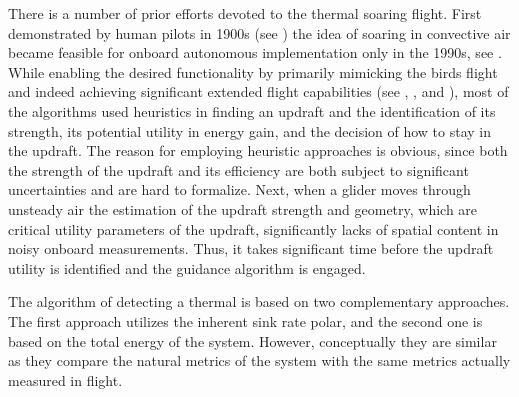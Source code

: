 \documentclass{ifacconf}
\begin{document}
There is a number of prior efforts devoted to the thermal soaring flight.
First demonstrated by human pilots in 1900s (see \cite{Simons:1998}) the idea
of soaring in convective air became feasible for onboard autonomous
implementation only in the 1990s, see \cite{Wharington:1998}. While enabling
the desired functionality by primarily mimicking the birds flight and indeed
achieving significant extended flight capabilities (see \cite{Edwards:2008},
\cite{Allen:2006}, and \cite{Allen:2007}), most of the algorithms used
heuristics in finding an updraft and the identification of its strength, its
potential utility in energy gain, and the decision of how to stay in the
updraft. The reason for employing heuristic approaches is obvious, since both
the strength of the updraft and its efficiency are both subject to
significant uncertainties and are hard to formalize.
Next, when a glider moves through unsteady air the estimation of the updraft
strength and geometry, which are critical utility parameters of the updraft,
significantly lacks of spatial content in noisy onboard measurements. Thus,
it takes significant time before the updraft utility is identified and the
guidance algorithm is engaged.
%
%

The algorithm of detecting a thermal is based on two complementary
approaches. The first approach utilizes the inherent sink rate polar, and the
second one is based on the total energy of the system. However, conceptually
they are similar as they compare the natural metrics of the system with the
same metrics actually measured in flight.

\end{document}
